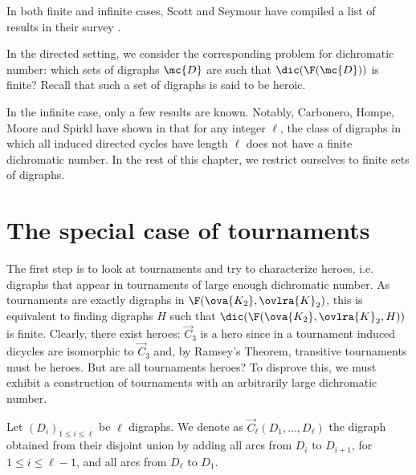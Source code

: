 In both finite and infinite cases, Scott and Seymour have compiled a list of results in their survey \cite{SS20}.

\medskip


In the directed setting, we consider the corresponding problem for dichromatic number: which sets of digraphs $\mc{D}$ are such that $\dic(\F(\mc{D}))$ is finite? Recall that such a set of digraphs is said to be heroic.

In the infinite case, only a few results are known. Notably, Carbonero, Hompe, Moore and Spirkl have shown in \cite{CHMS22} that for any integer $\ell$, the class of digraphs in which all induced directed cycles have length $\ell$ does not have a finite dichromatic number. In the rest of this chapter, we restrict ourselves to finite sets of digraphs. 


\section{The special case of tournaments}

The first step is to look at tournaments and try to characterize heroes, i.e. digraphs that appear in tournaments of large enough dichromatic number. As tournaments are exactly digraphs in $\F(\ova{K_2}, \ovlra{K}_2)$, this is equivalent to finding digraphs $H$ such that $\dic(\F(\ova{K_2},\ovlra{K}_2,H))$ is finite. Clearly, there exist heroes: $\vec C_{3}$ is a hero since in a tournament induced dicycles are isomorphic to $\vec C_{3}$ and, by Ramsey's Theorem, transitive tournaments must be heroes. But are all tournaments heroes? To disprove this, we must exhibit a construction of tournaments with an arbitrarily large dichromatic number. 


Let $(D_i)_{1 \leq i \leq \ell}$ be $\ell$ digraphs. We denote as $\vec C_{\ell}(D_1,\dots,D_{\ell})$ the digraph obtained from their disjoint union by adding all arcs from $D_i$ to $D_{i+1}$, for $1 \leq i \leq \ell - 1$, and all arcs from $D_{\ell}$ to $D_1$. %

